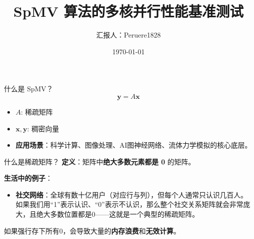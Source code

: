 \documentclass{beamer}
\title[]{SpMV 算法的多核并行性能基准测试}
\author[Peruere1828（南京大学）]{汇报人：Peruere1828}
\institute[南京大学]{南京大学，\\
		fmyh1828@gmail.com}
\date{\today}
\begin{document}
	
	\begin{frame}
		\titlepage
	\end{frame}

	\begin{frame}{什么是 SpMV？}
	\begin{equation*}
		\mathbf{y} = A \mathbf{x}
	\end{equation*}
	\begin{itemize}
		\item $A$: 稀疏矩阵
		\item $\mathbf{x}, \mathbf{y}$: 稠密向量
	\end{itemize}
	
	\vskip 0.5cm
	\begin{itemize}
		\item \textbf{应用场景}：科学计算、图像处理、AI图神经网络、流体力学模拟的核心底层。
	\end{itemize}
\end{frame}
	
	\begin{frame}{什么是稀疏矩阵？}
		\textbf{定义}：矩阵中\textbf{绝大多数元素都是 0} 的矩阵。
		
		\textbf{生活中的例子}：
		\begin{itemize}
			\item \textbf{社交网络}：全球有数十亿用户（对应行与列），但每个人通常只认识几百人。如果我们用“1”表示认识、“0”表示不认识，那么整个社交关系矩阵就会非常庞大，且绝大多数位置都是0——这就是一个典型的稀疏矩阵。
		\end{itemize}
		
		如果强行存下所有0，会导致大量的\textbf{内存浪费}和\textbf{无效计算}。
	\end{frame}
	
\end{document}
